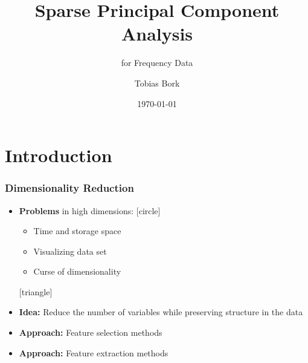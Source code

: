 \documentclass{beamer}
\theoremstyle{plain}
\theoremstyle{definition}
\begin{document}
\title{Sparse Principal Component Analysis}
\subtitle{for Frequency Data}   
\author{Tobias Bork} 
\date{\today}

\begin{frame}
\titlepage
\end{frame}



\section{Introduction} 
\begin{frame}
\frametitle{Dimensionality Reduction} 

\begin{itemize}
\item \textbf{Problems} in high dimensions: 
[circle]
	\begin{itemize}
	\item Time and storage space
	\item Visualizing data set
	\item Curse of dimensionality
	\end{itemize}
[triangle]
\item \textbf{Idea:} Reduce the number of variables while preserving structure in the data
\item \textbf{Approach:} Feature selection methods
\item \textbf{Approach:} Feature extraction methods

\end{itemize}
\end{frame}
\end{document}
